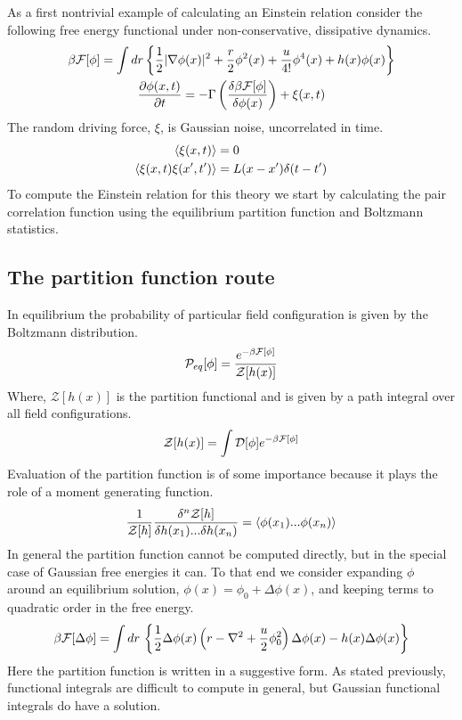 As a first nontrivial example of calculating an Einstein relation consider the
following free energy functional under non-conservative, dissipative dynamics.
%
\begin{gather}
    \beta \mathcal{F}[\phi] = \int dr \left\lbrace \frac{1}{2}\vert \nabla
    \phi(x) \vert^2 + \frac{r}{2}\phi^2(x) + \frac{u}{4!}\phi^4(x)  +
    h(x)\phi(x)\right\rbrace \\ \frac{\partial \phi(x,t)}{\partial t} = -\Gamma
    \left(\frac{\delta \beta \mathcal{F}[\phi]}{\delta \phi(x)}\right) + \xi(x, t)
\end{gather}
%
The random driving force, $\xi$, is Gaussian noise, uncorrelated in time.
%
\begin{align} \left\langle \xi (x, t) \right\rangle &= 0 \\ \left\langle \xi (x, t)
\xi(x^\prime, t^\prime) \right\rangle  &= L(x-x^\prime) \delta (t - t^\prime)
\end{align}
%
To compute the Einstein relation for this theory we start by calculating the
pair correlation function using the equilibrium partition function and
Boltzmann statistics.

\subsection{The partition function route}

In equilibrium the probability of particular field configuration is given by
the Boltzmann distribution.
%
\begin{equation} \mathcal{P}_{eq}[\phi] =
\frac{e^{-\beta\mathcal{F}[\phi]}}{\mathcal{Z}[h(x)]} \end{equation}
%
Where, $\mathcal{Z}[h(x)]$ is the partition functional and is given by a path
integral over all field configurations.
%
\begin{equation} \mathcal{Z}[h(x)] = \int \mathcal{D}[\phi] e^{-\beta\mathcal{F}[\phi]}
\end{equation}
%
Evaluation of the partition function is of some importance because it plays the
role of a moment generating function.
%
\begin{equation}\label{gen} \frac{1}{\mathcal{Z}[h]}\frac{\delta^n \mathcal{Z}[h]}{\delta
h(x_1)...\delta h(x_n)} = \langle \phi(x_1)...\phi(x_n)\rangle \end{equation}
%
In general the partition function cannot be computed directly, but in the
special case of Gaussian free energies it can. To that end we consider
expanding $\phi$ around an equilibrium solution, $\phi(x) = \phi_0 +
\Delta\phi(x)$, and keeping terms to quadratic order in the free energy.
%
\begin{equation} \beta\mathcal{F}[\Delta\phi] = \int dr \,\left\lbrace
\frac{1}{2}\Delta\phi(x) \left(r - \nabla^2 + \frac{u}{2}\phi_0^2\right)
\Delta\phi(x) - h(x)\Delta\phi(x) \right\rbrace \end{equation}
%
Here the partition function is written in a suggestive form. As stated
previously, functional integrals are difficult to compute in general, but
Gaussian functional integrals do have a solution.

